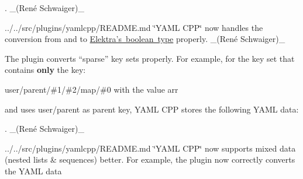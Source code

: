 \begin{DoxyCode}{0}
\end{DoxyCode}


. \+\_\+(René Schwaiger)\+\_\+


\begin{DoxyItemize}
\item ../../src/plugins/yamlcpp/\+R\+E\+A\+D\+ME.md \char`\"{}\+Y\+A\+M\+L C\+P\+P\char`\"{} now handles the conversion from and to \mbox{\hyperlink{doc_decisions_boolean_md}{Elektra’s boolean type}} properly. \+\_\+(René Schwaiger)\+\_\+
\item The plugin converts “sparse” key sets properly. For example, for the key set that contains {\bfseries{only}} the key\+:
\begin{DoxyItemize}
\item {\ttfamily user/parent/\#1/\#2/map/\#0} with the value {\ttfamily arr}
\end{DoxyItemize}

and uses {\ttfamily user/parent} as parent key, Y\+A\+ML C\+PP stores the following Y\+A\+ML data\+:
\end{DoxyItemize}


\begin{DoxyCode}{0}
\DoxyCodeLine{- ~}
\DoxyCodeLine{- - ~}
\DoxyCodeLine{  - ~}
\end{DoxyCode}


. \+\_\+(René Schwaiger)\+\_\+


\begin{DoxyItemize}
\item ../../src/plugins/yamlcpp/\+R\+E\+A\+D\+ME.md \char`\"{}\+Y\+A\+M\+L C\+P\+P\char`\"{} now supports mixed data (nested lists \& sequences) better. For example, the plugin now correctly converts the Y\+A\+ML data
\end{DoxyItemize}


\begin{DoxyCode}{0}
\end{DoxyCode}


